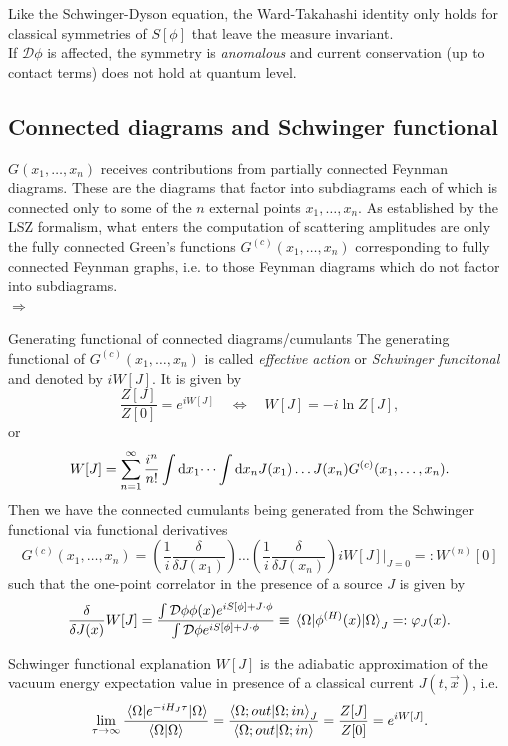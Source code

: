 Like the Schwinger-Dyson equation, the Ward-Takahashi identity only holds for classical symmetries of $S[\phi]$ that leave the measure invariant.\\
If $\mathcal{D}\phi$ is affected, the symmetry is \emph{anomalous} and current conservation (up to contact terms) does not hold at quantum level.


\subsection{Connected diagrams and Schwinger functional}
$G(x_1,\dots, x_n)$ receives contributions from partially connected Feynman diagrams. These are the diagrams that factor into subdiagrams each of which is connected only to some of the $n$ external points $x_1,\dots, x_n$. As established by the LSZ formalism, what enters the computation of scattering amplitudes are only the fully connected Green's functions $G^{(c)} (x_1, \dots, x_n)$ corresponding to fully connected Feynman graphs, i.e. to those Feynman diagrams which do not factor into subdiagrams. \\
$\Rightarrow$ 
\begin{mybox}{Generating functional of connected diagrams/cumulants}
	The generating functional of $G^{(c)}(x_1,\dots,x_n)$ is called \emph{effective action} or \emph{Schwinger funcitonal}  and denoted by $i W[J]$. It is given by 
	\begin{equation}
		\frac{Z[J]}{Z[0]} = e^{i W[J]}\quad  \Leftrightarrow \quad W[J] =-i \ln Z[J],
	\end{equation}
	or
	\begin{equation}
		W[J] = \sum_{n=1}^{\infty}\frac{i^n}{n!}\int \mathrm{d} x_1 \dots \int \mathrm{d} x_n J(x_1) \dots J(x_n) G^{(c)}(x_1,\dots,x_n).
	\end{equation}
Then we have the connected cumulants being generated from the Schwinger functional via functional derivatives
\begin{equation}
	G^{(c)}(x_1,\dots,x_n) = \left(\frac{1}{i} \frac{\delta }{\delta J(x_1)}\right) \dots \left(\frac{1}{i} \frac{\delta}{\delta J(x_n)}\right) i W[J] |_{J=0} =: W^{(n)}[0]
\end{equation}
such that the one-point correlator in the presence of a source $J$ is given by
\begin{equation}
	\frac{\delta }{\delta J(x)} W[J] = \frac{\int \mathcal{D} \phi \phi(x) e^{iS[\phi] +J\cdot \phi} }{\int \mathcal{D} \phi e^{i S[\phi]+J\cdot \phi}} \equiv \expval{\phi^{(H)}(x)}{\Omega}_J=:\varphi_J (x).
\end{equation}
	\end{mybox}
\begin{mybox}{Schwinger functional explanation}
	$W[J]$ is the adiabatic approximation of the vacuum energy expectation value in presence of a classical current $J(t,\vec{x})$, i.e.
	\begin{equation}
		\lim_{\tau \rightarrow \infty} \frac{\expval{e^{-i H_J \tau} }{\Omega}}{\braket{\Omega}{\Omega}} = \frac{\braket{\Omega;out}{\Omega;in}_J}{\braket{\Omega;out}{\Omega;in}} = \frac{Z[J]}{Z[0]} = e^{iW[J]}.
	\end{equation}
\end{mybox}

